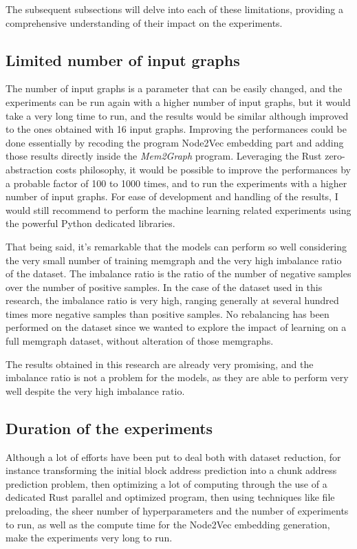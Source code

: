 The subsequent subsections will delve into each of these limitations, providing a comprehensive understanding of their impact on the experiments.

\subsection{Limited number of input graphs}
The number of input graphs is a parameter that can be easily changed, and the experiments can be run again with a higher number of input graphs, but it would take a very long time to run, and the results would be similar although improved to the ones obtained with 16 input graphs. Improving the performances could be done essentially by recoding the program Node2Vec embedding part and adding those results directly inside the \textit{Mem2Graph} program. Leveraging the Rust zero-abstraction costs philosophy, it would be possible to improve the performances by a probable factor of 100 to 1000 times, and to run the experiments with a higher number of input graphs. For ease of development and handling of the results, I would still recommend to perform the machine learning related experiments using the powerful Python dedicated libraries.

That being said, it's remarkable that the models can perform so well considering the very small number of training memgraph and the very high imbalance ratio of the dataset. The imbalance ratio is the ratio of the number of negative samples over the number of positive samples. In the case of the dataset used in this research, the imbalance ratio is very high, ranging generally at several hundred times more negative samples than positive samples. No rebalancing has been performed on the dataset since we wanted to explore the impact of learning on a full memgraph dataset, without alteration of those memgraphs.

The results obtained in this research are already very promising, and the imbalance ratio is not a problem for the models, as they are able to perform very well despite the very high imbalance ratio.

\subsection{Duration of the experiments}

Although a lot of efforts have been put to deal both with dataset reduction, for instance transforming the initial block address prediction into a chunk address prediction problem, then optimizing a lot of computing through the use of a dedicated Rust parallel and optimized program, then using techniques like file preloading, the sheer number of hyperparameters and the number of experiments to run, as well as the compute time for the Node2Vec embedding generation, make the experiments very long to run. 


